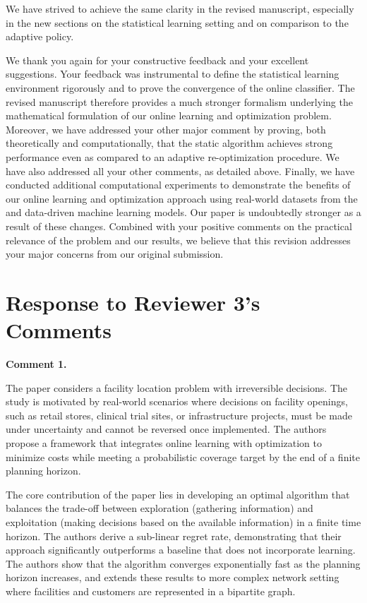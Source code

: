 \documentclass[11pt]{article}
\begin{document}
We have strived to achieve the same clarity in the revised manuscript, especially in the new sections on the statistical learning setting and on comparison to the adaptive policy.

\vspace{12pt}

We thank you again for your constructive feedback and your excellent suggestions. Your feedback was instrumental to define the statistical learning environment rigorously and to prove the convergence of the online classifier. The revised manuscript therefore provides a much stronger formalism underlying the mathematical formulation of our online learning and optimization problem. Moreover, we have addressed your other major comment by proving, both theoretically and computationally, that the static algorithm achieves strong performance even as compared to an adaptive re-optimization procedure. We have also addressed all your other comments, as detailed above. Finally, we have conducted additional computational experiments to demonstrate the benefits of our online learning and optimization approach using real-world datasets from the \cite{UCI} and data-driven machine learning models. Our paper is undoubtedly stronger as a result of these changes. Combined with your positive comments on the practical relevance of the problem and our results, we believe that this revision addresses your major concerns from our original submission.

\newpage
\section*{Response to Reviewer 3's Comments}
%

\begin{commentBox}
    \textbf{Comment 1.}\label{R3:1}

    The paper considers a facility location problem with irreversible decisions. The study is motivated by real-world scenarios where decisions on facility openings, such as retail stores, clinical trial sites, or infrastructure projects, must be made under uncertainty and cannot be reversed once implemented. The authors propose a framework that integrates online learning with optimization to minimize costs while meeting a probabilistic coverage target by the end of a finite planning horizon.

    The core contribution of the paper lies in developing an optimal algorithm that balances the trade-off between exploration (gathering information) and exploitation (making decisions based on the available information) in a finite time horizon. The authors derive a sub-linear regret rate, demonstrating that their approach significantly outperforms a baseline that does not incorporate learning. The authors show that the algorithm converges exponentially fast as the planning horizon increases, and extends these results to more complex network setting where facilities and customers are represented in a bipartite graph.
\end{commentBox}
\end{document}
